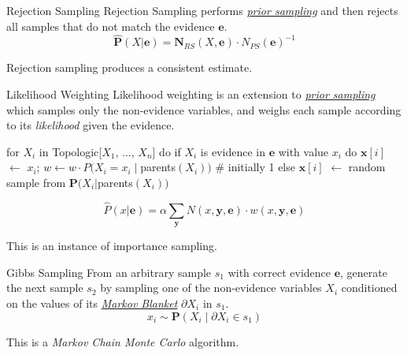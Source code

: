 \documentclass{cognito}
\begin{document}
\begin{note}{Rejection Sampling}
	Rejection Sampling performs \hyperref[note:Direct Sampling]{\emph{prior sampling}}
	and then rejects all samples that do not match the evidence $\mathbf{e}$.
	$$
		\textstyle \mathbf{\hat{P}}(X | \mathbf{e}) = \mathbf{N}_{RS}(X, \mathbf{e}) \cdot N_{PS}(\mathbf{e})^{-1}
	$$
	\begin{remark} Rejection sampling produces a consistent estimate.\end{remark}
	\vspace{-5pt}
\end{note}

\begin{note}{Likelihood Weighting}
	Likelihood weighting is an extension to  \hyperref[note:Direct Sampling]{\it prior sampling} which
	samples only the non-evidence variables, and weighs each sample according to
	its \emph{likelihood} given the evidence.
	\begin{code}
for $X_i$ in Topologic[$X_1$, ..., $X_n$] do
	if $X_i$ is evidence in $\mathbf{e}$ with value $x_i$ do
		$\mathbf{x}[i]$ $\leftarrow$ $x_i$; $w \leftarrow w \cdot P(X_i = x_i \mid $parents$(X_i))$  # initially 1
	else $\mathbf{x}[i]$ $\leftarrow$ random sample from $\mathbf{P}(X_i | $parents$(X_i) )$
	\end{code}
	$$
		\textstyle \hat{P}(x | \mathbf{e}) = \alpha \sum_\mathbf{y} N(x, \mathbf{y}, \mathbf{e}) \cdot w(x, \mathbf{y}, \mathbf{e})
	$$
	\begin{remark} This is an instance of importance sampling.\end{remark}
	\vspace{-5pt}
\end{note}

\begin{note}{Gibbs Sampling}
	From an arbitrary sample $s_1$ with correct evidence $\mathbf{e}$, generate the next sample $s_2$ by sampling
	one of the non-evidence variables $X_i$
	conditioned on the values of its \hyperref[note:Markov Blanket]{\emph{Markov Blanket}} $\partial X_i$ in $s_1$.
	$$ x_i \sim \mathbf{P}(X_i \mid \partial X_i \in s_1)$$
	\begin{remark} This is a \emph{Markov Chain Monte Carlo} algorithm.
	\end{remark}
	\vspace{-5pt}
\end{note}
\end{document}
